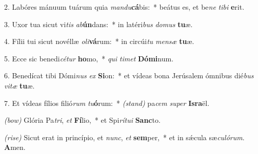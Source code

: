 2. Labóres mánuum tuárum quia \textit{man}\textit{du}\textbf{cá}bis:~* beátus es, et be\textit{ne} \textit{ti}\textit{bi} \textbf{e}rit.

3. Uxor tua sicut vi\textit{tis} \textit{ab}\textbf{ún}dans:~* in latéri\textit{bus} \textit{do}\textit{mus} \textbf{tu}æ.

4. Fílii tui sicut novéllæ \textit{o}\textit{li}\textbf{vá}rum:~* in circúi\textit{tu} \textit{men}\textit{sæ} \textbf{tu}æ.

5. Ecce sic benedi\textit{cé}\textit{tur} \textbf{ho}mo,~* \textit{qui} \textit{ti}\textit{met} \textbf{Dó}\textbf{mi}num.

6. Benedícat tibi Dómi\textit{nus} \textit{ex} \textbf{Si}on:~* et vídeas bona Jerúsalem ómnibus dié\textit{bus} \textit{vi}\textit{tæ} \textbf{tu}æ.

7. Et vídeas fílios filió\textit{rum} \textit{tu}\textbf{ó}rum:~* {\color{red}\textit{(stand)}} pa\textit{cem} \textit{su}\textit{per} \textbf{Is}\textbf{ra}ël.

{\color{red}\textit{(bow)}} Glória Pa\textit{tri}, \textit{et} \textbf{Fí}lio,~* et Spi\textit{rí}\textit{tu}\textit{i} \textbf{Sanc}to.

{\color{red}\textit{(rise)}} Sicut erat in princípio, et \textit{nunc}, \textit{et} \textbf{sem}per,~* et in s\'{\ae}cula sæ\textit{cu}\textit{ló}\textit{rum}. \textbf{A}men.